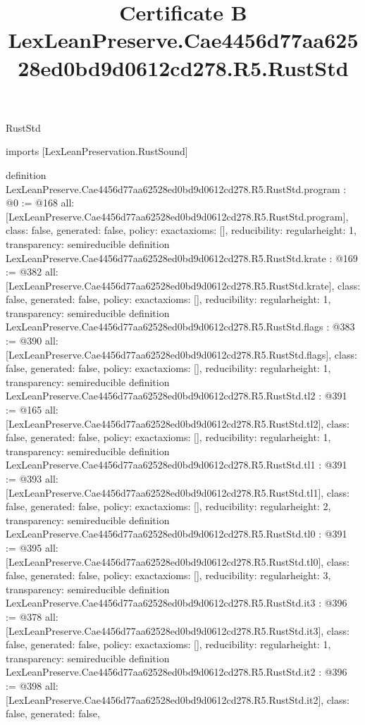 \begin{lexlean}{RustStd}
\title{Certificate B LexLeanPreserve.Cae4456d77aa62528ed0bd9d0612cd278.R5.RustStd}
\begin{coremodule}
imports [LexLeanPreservation.RustSound]

definition LexLeanPreserve.Cae4456d77aa62528ed0bd9d0612cd278.R5.RustStd.program : @0 := @168 {
  all: [LexLeanPreserve.Cae4456d77aa62528ed0bd9d0612cd278.R5.RustStd.program],
  class: false,
  generated: false,
  policy: exact{axioms: []},
  reducibility: regular{height: 1},
  transparency: semireducible
}
definition LexLeanPreserve.Cae4456d77aa62528ed0bd9d0612cd278.R5.RustStd.krate : @169 := @382 {
  all: [LexLeanPreserve.Cae4456d77aa62528ed0bd9d0612cd278.R5.RustStd.krate],
  class: false,
  generated: false,
  policy: exact{axioms: []},
  reducibility: regular{height: 1},
  transparency: semireducible
}
definition LexLeanPreserve.Cae4456d77aa62528ed0bd9d0612cd278.R5.RustStd.flags : @383 := @390 {
  all: [LexLeanPreserve.Cae4456d77aa62528ed0bd9d0612cd278.R5.RustStd.flags],
  class: false,
  generated: false,
  policy: exact{axioms: []},
  reducibility: regular{height: 1},
  transparency: semireducible
}
definition LexLeanPreserve.Cae4456d77aa62528ed0bd9d0612cd278.R5.RustStd.tl2 : @391 := @165 {
  all: [LexLeanPreserve.Cae4456d77aa62528ed0bd9d0612cd278.R5.RustStd.tl2],
  class: false,
  generated: false,
  policy: exact{axioms: []},
  reducibility: regular{height: 1},
  transparency: semireducible
}
definition LexLeanPreserve.Cae4456d77aa62528ed0bd9d0612cd278.R5.RustStd.tl1 : @391 := @393 {
  all: [LexLeanPreserve.Cae4456d77aa62528ed0bd9d0612cd278.R5.RustStd.tl1],
  class: false,
  generated: false,
  policy: exact{axioms: []},
  reducibility: regular{height: 2},
  transparency: semireducible
}
definition LexLeanPreserve.Cae4456d77aa62528ed0bd9d0612cd278.R5.RustStd.tl0 : @391 := @395 {
  all: [LexLeanPreserve.Cae4456d77aa62528ed0bd9d0612cd278.R5.RustStd.tl0],
  class: false,
  generated: false,
  policy: exact{axioms: []},
  reducibility: regular{height: 3},
  transparency: semireducible
}
definition LexLeanPreserve.Cae4456d77aa62528ed0bd9d0612cd278.R5.RustStd.it3 : @396 := @378 {
  all: [LexLeanPreserve.Cae4456d77aa62528ed0bd9d0612cd278.R5.RustStd.it3],
  class: false,
  generated: false,
  policy: exact{axioms: []},
  reducibility: regular{height: 1},
  transparency: semireducible
}
definition LexLeanPreserve.Cae4456d77aa62528ed0bd9d0612cd278.R5.RustStd.it2 : @396 := @398 {
  all: [LexLeanPreserve.Cae4456d77aa62528ed0bd9d0612cd278.R5.RustStd.it2],
  class: false,
  generated: false,
}
\end{coremodule}
\end{lexlean}
